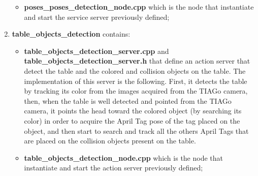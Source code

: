 \begin{enumerate}
\begin{itemize}
        \item \textbf{poses\_poses\_detection\_node.cpp} which is the node that instantiate and start the service server previously defined;
    \end{itemize}
    \item \textbf{table\_objects\_detection} contains: 
    \begin{itemize}
        \item \textbf{table\_objects\_detection\_server.cpp} and \textbf{table\_objects\_detection\_server.h} that define an action server that detect the table and the colored and collision objects on the table. The implementation of this server is the following. First, it detects the table by tracking its color from the images acquired from the TIAGo camera, then, when the table is well detected and pointed from the TIAGo camera, it points the head toward the colored object (by searching its color) in order to acquire the April Tag pose of the tag placed on the object, and then start to search and track all the others April Tags that are placed on the collision objects present on the table. 
        \item \textbf{table\_objects\_detection\_node.cpp} which is the node that instantiate and start the action server previously defined;
    \end{itemize}
\end{enumerate}

